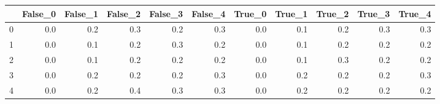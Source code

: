 \begin{tabular}{lrrrrrrrrrr}
\toprule
{} &  False\_0 &  False\_1 &  False\_2 &  False\_3 &  False\_4 &  True\_0 &  True\_1 &  True\_2 &  True\_3 &  True\_4 \\ \hline
\midrule
0 &      0.0 &      0.2 &      0.3 &      0.2 &      0.3 &     0.0 &     0.1 &     0.2 &     0.3 &     0.3 \\ \hline
1 &      0.0 &      0.1 &      0.2 &      0.3 &      0.2 &     0.0 &     0.1 &     0.2 &     0.2 &     0.2 \\ \hline
2 &      0.0 &      0.1 &      0.2 &      0.2 &      0.2 &     0.0 &     0.1 &     0.3 &     0.2 &     0.2 \\ \hline
3 &      0.0 &      0.2 &      0.2 &      0.2 &      0.3 &     0.0 &     0.2 &     0.2 &     0.2 &     0.3 \\ \hline
4 &      0.0 &      0.2 &      0.4 &      0.3 &      0.3 &     0.0 &     0.2 &     0.2 &     0.2 &     0.2 \\ \hline
\bottomrule
\end{tabular}
